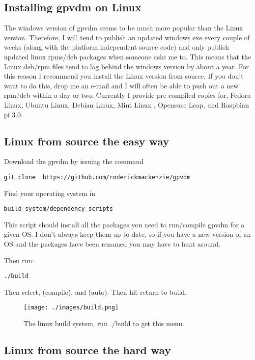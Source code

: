 \subsection{Installing gpvdm on Linux} \label{installing_on_linux}
The windows version of gpvdm seems to be much more popular than the Linux version.  Therefore, I will tend to publish an updated windows exe every couple of weeks (along with the platform independent source code) and only publish updated linux rpms/deb packages when someone asks me to.  This means that the Linux deb/rpm files tend to lag behind the windows version by about a year.  For this reason I recommend you install the Linux version from source.  If you don't want to do this, drop me an e-mail and I will often be able to push out a new rpm/deb within a day or two.  Currently I provide pre-compiled copies for, Fedora Linux, Ubuntu Linux, Debian Linux, Mint Linux , Opensuse Leap, and Raspbian pi 3.0.


\subsection{Linux from source the easy way}
Download the gpvdm by issuing the command

\begin{lstlisting}
git clone  https://github.com/roderickmackenzie/gpvdm
\end{lstlisting}
Find your operating system in

\begin{lstlisting}
build_system/dependency_scripts
\end{lstlisting}

This script should install all the packages you need to run/compile gpvdm for a given OS. I don't always keep them up to date, so if you have a new version of an OS and the packages have been renamed you may have to hunt around.

Then run:
\begin{lstlisting}
./build
\end{lstlisting}

Then select, (compile), and (auto). Then hit return to build.


\begin{figure}[ht!]
\centering
\texttt{[image: ./images/build.png]}
\caption{The linux build system, run ./build to get this menu.  }
\label{fig:build}
\end{figure}


\subsection{Linux from source the hard way}


